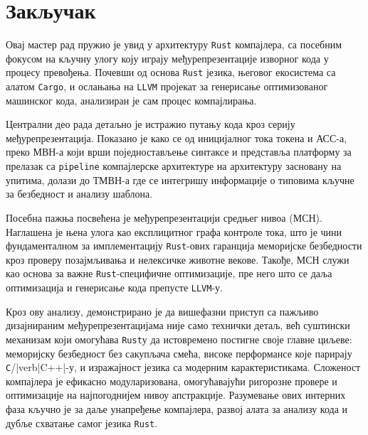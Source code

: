 \section{Закључак}

Овај мастер рад пружио је увид у архитектуру \verb|Rust| компајлера, са посебним фокусом на кључну улогу коју играју међурепрезентације изворног кода у процесу превођења. 
Почевши од основа \verb|Rust| језика, његовог екосистема са алатом \verb|Cargo|, и ослањања на \verb|LLVM| пројекат за генерисање оптимизованог машинског кода, 
анализиран је сам процес компајлирања.

Централни део рада детаљно је истражио путању кода кроз серију међурепрезентација. 
Показано је како се од иницијалног тока токена и АСС-а, преко МВН-а који врши поједностављење синтаксе и представља платформу за прелазак са \verb|pipeline|
компајлерске архитектуре на архитектуру засновану на упитима, долази до ТМВН-а где се интегришу информације о типовима кључне за безбедност 
и анализу шаблона.

Посебна пажња посвећена је међурепрезентацији средњег нивоа (МСН). Наглашена је њена улога као експлицитног графа контроле тока,
што је чини фундаменталном за имплементацију \verb|Rust|-ових гаранција меморијске безбедности кроз проверу позајмљивања и нелексичке животне векове.
Такође, МСН служи као основа за важне \verb|Rust|-специфичне оптимизације, пре него што се даља оптимизација и генерисање кода препусте \verb|LLVM|-у.

Кроз ову анализу, демонстрирано је да вишефазни приступ са пажљиво дизајнираним међурепрезентацијама није само технички детаљ,
већ суштински механизам који омогућава \verb|Rust|у да истовремено постигне своје главне циљеве: меморијску безбедност без сакупљача смећа,
високе перформансе које парирају \verb|C|/|verb|C++|-у, и изражајност језика са модерним карактеристикама. Сложеност компајлера је ефикасно модуларизована,
омогућавајући ригорозне провере и оптимизације на најпогоднијем нивоу апстракције. Разумевање ових интерних фаза кључно је за даље унапређење компајлера,
развој алата за анализу кода и дубље схватање самог језика \verb|Rust|.